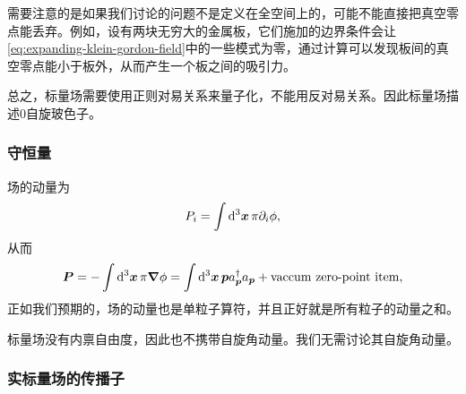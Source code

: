 需要注意的是如果我们讨论的问题不是定义在全空间上的，可能不能直接把真空零点能丢弃。例如，设有两块无穷大的金属板，它们施加的边界条件会让\eqref{eq:expanding-klein-gordon-field}中的一些模式为零，通过计算可以发现板间的真空零点能小于板外，从而产生一个板之间的吸引力。

总之，标量场需要使用正则对易关系来量子化，不能用反对易关系。因此标量场描述$0$自旋玻色子。

\subsubsection{守恒量}

场的动量为
\[
    P_i = \int \dd[3]{\vb*{x}} \pi \partial_i \phi,
\]
从而
\begin{equation}
    {\vb*{P}} = - \int \dd[3]{\vb*{x}} {\pi} \grad{{\phi}} = \int \dd[3]{\vb*{x}} \vb*{p} {a}^\dagger_{\vb*{p}} {a}_{\vb*{p}} + \text{vaccum zero-point item},
\end{equation}
正如我们预期的，场的动量也是单粒子算符，并且正好就是所有粒子的动量之和。

标量场没有内禀自由度，因此也不携带自旋角动量。我们无需讨论其自旋角动量。

\subsubsection{实标量场的传播子}


